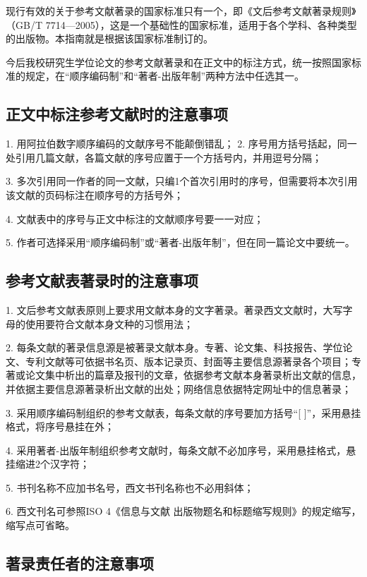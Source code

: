 现行有效的关于参考文献著录的国家标准只有一个，即《文后参考文献著录规则》（GB/T 7714—2005），这是一个基础性的国家标准，适用于各个学科、各种类型的出版物。本指南就是根据该国家标准制订的。

今后我校研究生学位论文的参考文献著录和在正文中的标注方式，统一按照国家标准的规定，在“顺序编码制”和“著者-出版年制”两种方法中任选其一。

\subsection{正文中标注参考文献时的注意事项}

1. 用阿拉伯数字顺序编码的文献序号不能颠倒错乱；
2. 序号用方括号括起，同一处引用几篇文献，各篇文献的序号应置于一个方括号内，并用逗号分隔；

3. 多次引用同一作者的同一文献，只编1个首次引用时的序号，但需要将本次引用该文献的页码标注在顺序号的方括号外；

4. 文献表中的序号与正文中标注的文献顺序号要一一对应；

5. 作者可选择采用“顺序编码制”或“著者-出版年制”，但在同一篇论文中要统一。

\subsection{参考文献表著录时的注意事项}

1. 文后参考文献表原则上要求用文献本身的文字著录。著录西文文献时，大写字母的使用要符合文献本身文种的习惯用法；

2. 每条文献的著录信息源是被著录文献本身。专著、论文集、科技报告、学位论文、专利文献等可依据书名页、版本记录页、封面等主要信息源著录各个项目；专著或论文集中析出的篇章及报刊的文章，依据参考文献本身著录析出文献的信息，并依据主要信息源著录析出文献的出处；网络信息依据特定网址中的信息著录；

3. 采用顺序编码制组织的参考文献表，每条文献的序号要加方括号“[  ]”，采用悬挂格式，将序号悬挂在外；

4. 采用著者-出版年制组织参考文献时，每条文献不必加序号，采用悬挂格式，悬挂缩进2个汉字符；

5. 书刊名称不应加书名号，西文书刊名称也不必用斜体；

6. 西文刊名可参照ISO 4《信息与文献  出版物题名和标题缩写规则》的规定缩写，缩写点可省略。

\subsection{著录责任者的注意事项}

